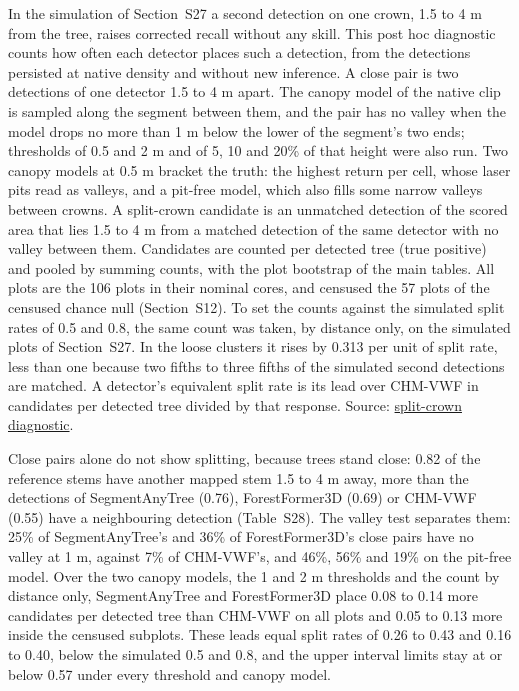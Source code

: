 \documentclass[10pt,a4paper]{article}
\begin{document}
In the simulation of Section~S27 a second detection on one crown, 1.5 to 4 m
from the tree, raises corrected recall without any skill. This post hoc
diagnostic counts how often each detector places such a detection, from the
detections persisted at native density and without new inference. A close pair
is two detections of one detector 1.5 to 4 m apart. The canopy model of the
native clip is sampled along the segment between them, and the pair has no
valley when the model drops no more than 1 m below the lower of the segment's
two ends; thresholds of 0.5 and 2 m and of 5, 10 and 20\% of that height were
also run. Two canopy models at 0.5 m bracket the truth: the highest return per
cell, whose laser pits read as valleys, and a pit-free model, which also fills
some narrow valleys between crowns. A split-crown candidate is an unmatched
detection of the scored area that lies 1.5 to 4 m from a matched detection of
the same detector with no valley between them. Candidates are counted per
detected tree (true positive) and pooled by summing counts, with the plot
bootstrap of the main tables. All plots are the 106 plots in their nominal
cores, and censused the 57 plots of the censused chance null (Section~S12). To
set the counts against the simulated split rates of 0.5 and 0.8, the same count
was taken, by distance only, on the simulated plots of Section~S27. In the loose
clusters it rises by 0.313 per unit of split rate, less than one because two
fifths to three fifths of the simulated second detections are matched. A
detector's equivalent split rate is its lead over CHM-VWF in candidates per
detected tree divided by that response. Source: \href{https://github.com/devakellc/lidar-tree-benchmark/blob/main/results/split-crown-diagnostic-results.md}{split-crown
diagnostic}.

Close pairs alone do not show splitting, because trees stand close: 0.82 of the
reference stems have another mapped stem 1.5 to 4 m away, more than the
detections of SegmentAnyTree (0.76), ForestFormer3D (0.69) or CHM-VWF (0.55)
have a neighbouring detection (Table~S28). The valley test separates them: 25\%
of SegmentAnyTree's and 36\% of ForestFormer3D's close pairs have no valley at
1 m, against 7\% of CHM-VWF's, and 46\%, 56\% and 19\% on the pit-free model. Over
the two canopy models, the 1 and 2 m thresholds and the count by distance only,
SegmentAnyTree and ForestFormer3D place 0.08 to 0.14 more candidates per
detected tree than CHM-VWF on all plots and 0.05 to 0.13 more inside the
censused subplots. These leads equal split rates of 0.26 to 0.43 and 0.16 to
0.40, below the simulated 0.5 and 0.8, and the upper interval limits stay at or
below 0.57 under every threshold and canopy model.
\end{document}
